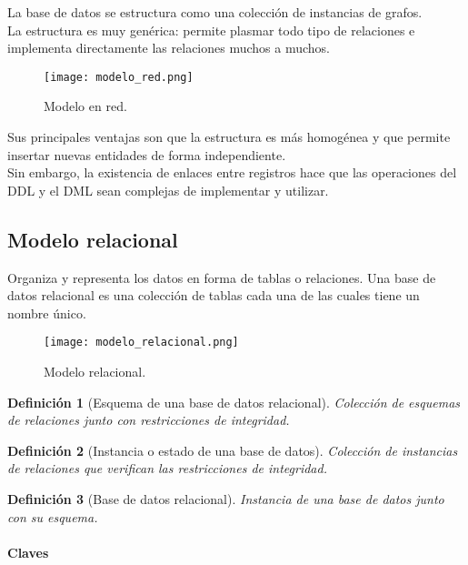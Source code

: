 \documentclass[12pt,spanish]{article}
\newtheorem{definition}{Definición}
\numberwithin{definition}{subsection}
\begin{document}
La base de datos se estructura como una colección de instancias de grafos.\\

La estructura es muy genérica: permite plasmar todo tipo de relaciones e implementa directamente las relaciones muchos a muchos.

\begin{figure}[H]
\centering
\texttt{[image: modelo\_red.png]}
\caption{Modelo en red.}
\end{figure}

Sus principales ventajas son que la estructura es más homogénea y que permite insertar nuevas entidades de forma independiente.\\
Sin embargo, la existencia de enlaces entre registros hace que las operaciones del DDL y el DML sean complejas de implementar y utilizar.

\subsection{Modelo relacional}


Organiza y representa los datos en forma de tablas o relaciones. Una base de datos relacional es una colección de tablas cada una de las cuales tiene un nombre único.

\begin{figure}[H]
\centering
\texttt{[image: modelo\_relacional.png]}
\caption{Modelo relacional.}
\end{figure}

\begin{definition}[Esquema de una base de datos relacional]
	Colección de esquemas de relaciones junto con restricciones de integridad.
\end{definition}

\begin{definition}[Instancia o estado de una base de datos]
	Colección de instancias de relaciones que verifican las restricciones de integridad.
\end{definition}

\begin{definition}[Base de datos relacional]
	Instancia de una base de datos junto con su esquema.
\end{definition}

\paragraph{Claves}
\end{document}
